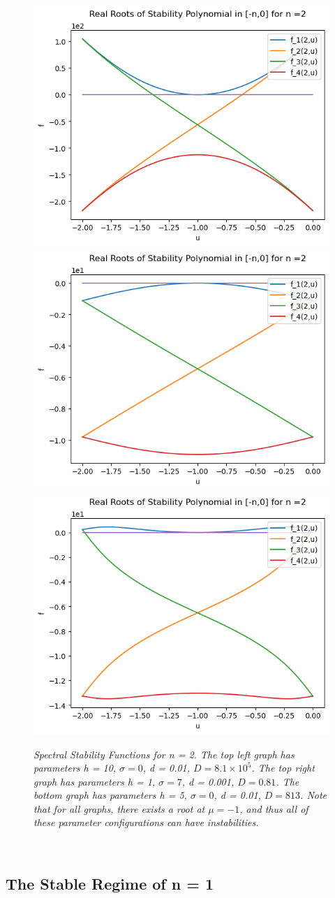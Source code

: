 \documentclass{article}
\begin{document}
\begin{figure}[hbt!]
\centering
\includegraphics[width=.5\textwidth]{special1.png}\hfill
\includegraphics[width=.5\textwidth]{special2.png}\hfill
\includegraphics[width=.5\textwidth]{special3.png}\hfill
\caption{\emph{Spectral Stability Functions for n = 2. The top left graph has parameters h = 10, \(\sigma = 0\), d = 0.01, \(D = 8.1 \times 10^5\). The top right graph has parameters h = 1, \(\sigma = 7\), d = 0.001, \(D = 0.81\). The bottom graph has parameters h = 5, \(\sigma = 0\), d = 0.01, \(D = 813\). Note that for all graphs, there exists a root at \(\mu = -1\), and thus all of these parameter configurations can have instabilities. }} \label{n=2}
\end{figure}
\\

\subsection{The Stable Regime of n = 1}
\end{document}
